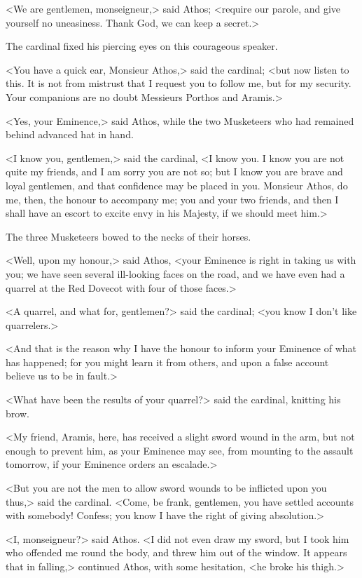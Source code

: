 <We are gentlemen, monseigneur,> said Athos; <require our parole, and give yourself no uneasiness. Thank God, we can keep a secret.> 

The cardinal fixed his piercing eyes on this courageous speaker. 

<You have a quick ear, Monsieur Athos,> said the cardinal; <but now listen to this. It is not from mistrust that I request you to follow me, but for my security. Your companions are no doubt Messieurs Porthos and Aramis.> 

<Yes, your Eminence,> said Athos, while the two Musketeers who had remained behind advanced hat in hand. 

<I know you, gentlemen,> said the cardinal, <I know you. I know you are not quite my friends, and I am sorry you are not so; but I know you are brave and loyal gentlemen, and that confidence may be placed in you. Monsieur Athos, do me, then, the honour to accompany me; you and your two friends, and then I shall have an escort to excite envy in his Majesty, if we should meet him.> 

The three Musketeers bowed to the necks of their horses. 

<Well, upon my honour,> said Athos, <your Eminence is right in taking us with you; we have seen several ill-looking faces on the road, and we have even had a quarrel at the Red Dovecot with four of those faces.> 

<A quarrel, and what for, gentlemen?> said the cardinal; <you know I don't like quarrelers.> 

<And that is the reason why I have the honour to inform your Eminence of what has happened; for you might learn it from others, and upon a false account believe us to be in fault.> 

<What have been the results of your quarrel?> said the cardinal, knitting his brow. 

<My friend, Aramis, here, has received a slight sword wound in the arm, but not enough to prevent him, as your Eminence may see, from mounting to the assault tomorrow, if your Eminence orders an escalade.> 

<But you are not the men to allow sword wounds to be inflicted upon you thus,> said the cardinal. <Come, be frank, gentlemen, you have settled accounts with somebody! Confess; you know I have the right of giving absolution.> 

<I, monseigneur?> said Athos. <I did not even draw my sword, but I took him who offended me round the body, and threw him out of the window. It appears that in falling,> continued Athos, with some hesitation, <he broke his thigh.> 

